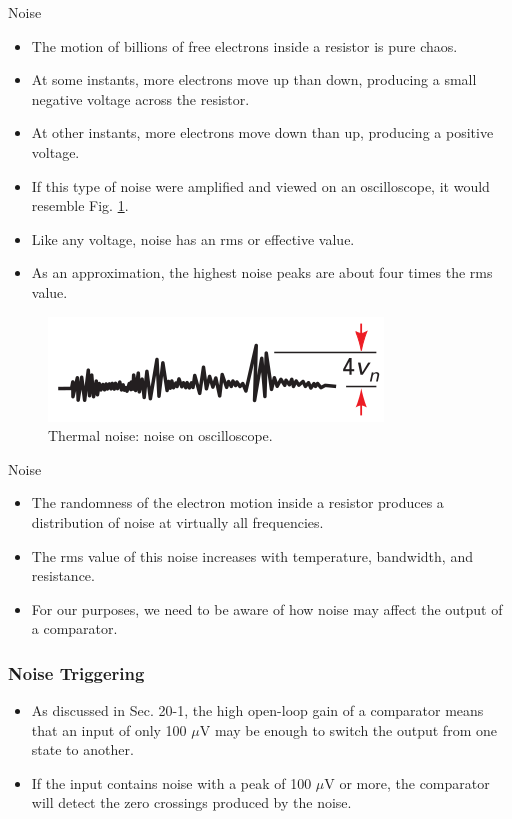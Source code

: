 \documentclass[pdflatex,compress]{beamer}
\begin{document}
\begin{frame}{Noise}
	\begin{multicols}{2}
		\begin{itemize}
			\item The motion of billions of free electrons inside a resistor is pure chaos.
			\item At some instants, more electrons move up than down, producing a small negative voltage across the resistor.
			\item At other instants, more electrons move down than up, producing a positive voltage.
			\item If this type of noise were amplified and viewed on an oscilloscope, it would resemble Fig. \ref{fig:2016b}.
			\item Like any voltage, noise has an rms or effective value.
			\item As an approximation, the highest noise peaks are about four times the rms value.
		\end{itemize}
		\begin{figure}
			\centering
			\includegraphics[width=\linewidth]{img/2016b}
			\caption{Thermal noise: noise on oscilloscope.}
			\label{fig:2016b}
		\end{figure}
	\end{multicols}
\end{frame}

\begin{frame}{Noise}
	\begin{itemize}
		\item The randomness of the electron motion inside a resistor produces a distribution of noise at virtually all frequencies.
		\item The rms value of this noise increases with temperature, bandwidth, and resistance.
		\item For our purposes, we need to be aware of how noise may affect the output of a comparator.
	\end{itemize}
\end{frame}

\begin{frame}
	\frametitle{Noise Triggering}
	\begin{itemize}
		\item As discussed in Sec. 20-1, the high open-loop gain of a comparator means that an input of only 100 $\mu$V may be enough to switch the output from one state to another.
		\item If the input contains noise with a peak of 100 $\mu$V or more, the comparator will detect the zero crossings produced by the noise.
	\end{itemize}
\end{frame}
\end{document}
